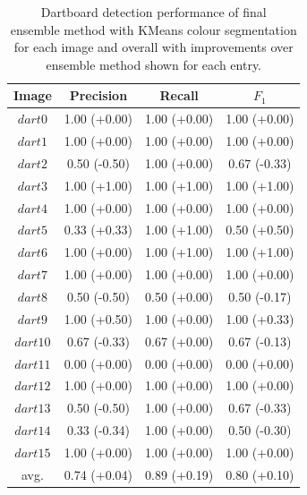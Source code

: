 \documentclass[11pt]{article}
\begin{document}
\begin{table}
\begin{tabular}{|c||c|c|c|} 
    \hline
    Image & Precision & Recall & $F_1$ \\ [0.5ex] 
    \hline
    $dart0$  & 1.00 (+0.00) & 1.00 (+0.00) & 1.00 (+0.00) \\
    $dart1$  & 1.00 (+0.00) & 1.00 (+0.00) & 1.00 (+0.00) \\
    $dart2$  & 0.50 (-0.50) & 1.00 (+0.00) & 0.67 (-0.33) \\
    $dart3$  & 1.00 (+1.00) & 1.00 (+1.00) & 1.00 (+1.00) \\
    $dart4$  & 1.00 (+0.00) & 1.00 (+0.00) & 1.00 (+0.00) \\
    $dart5$  & 0.33 (+0.33) & 1.00 (+1.00) & 0.50 (+0.50) \\
    $dart6$  & 1.00 (+0.00) & 1.00 (+1.00) & 1.00 (+1.00) \\
    $dart7$  & 1.00 (+0.00) & 1.00 (+0.00) & 1.00 (+0.00) \\
    $dart8$  & 0.50 (-0.50) & 0.50 (+0.00) & 0.50 (-0.17) \\
    $dart9$  & 1.00 (+0.50) & 1.00 (+0.00) & 1.00 (+0.33) \\
    $dart10$ & 0.67 (-0.33) & 0.67 (+0.00) & 0.67 (-0.13) \\
    $dart11$ & 0.00 (+0.00) & 0.00 (+0.00) & 0.00 (+0.00) \\
    $dart12$ & 1.00 (+0.00) & 1.00 (+0.00) & 1.00 (+0.00) \\
    $dart13$ & 0.50 (-0.50) & 1.00 (+0.00) & 0.67 (-0.33) \\
    $dart14$ & 0.33 (-0.34) & 1.00 (+0.00) & 0.50 (-0.30) \\
    $dart15$ & 1.00 (+0.00) & 1.00 (+0.00) & 1.00 (+0.00) \\
    \hline\hline
    avg.     & 0.74 (+0.04) & 0.89 (+0.19) & 0.80 (+0.10) \\
    \hline
\end{tabular}
\caption{Dartboard detection performance of final \\ ensemble method with KMeans colour segmentation for each image and overall with improvements over \\ ensemble method shown for each entry.}
\label{final_dartboards_results}
\end{table} 

\end{document}
